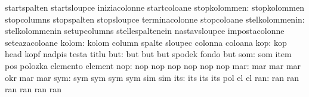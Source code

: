                                   startspalten                     startsloupce
                                  iniziacolonne                    startcoloane
                    stopkolommen: stopkolommen                     stopcolumns
                                  stopspalten                      stopsloupce
                                  terminacolonne                   stopcoloane
                  stelkolommenin: stelkolommenin                   setupcolumns
                                  stellespaltenein                 nastavsloupce
                                  impostacolonne                   seteazacoloane
                           kolom: kolom                            column
                                  spalte                           sloupec
                                  colonna                          coloana
                             kop: kop                              head
                                  kopf                             nadpis
                                  testa                            titlu %
                             but: but                              but
                                  but                              spodek
                                  fondo                            but
                             som: som                              item
                                  pos                              polozka
                                  elemento                         element
                             nop: nop                              nop
                                  nop                              nop
                                  nop                              nop
                             mar: mar                              mar
                                  mar                              okr
                                  mar                              mar
                             sym: sym                              sym
                                  sym                              sym
                                  sim                              sim
                             its: its                              its
                                  its                              pol %
                                  el                               el  %
                             ran: ran                              ran
                                  ran                              ran
                                  ran	                           ran
